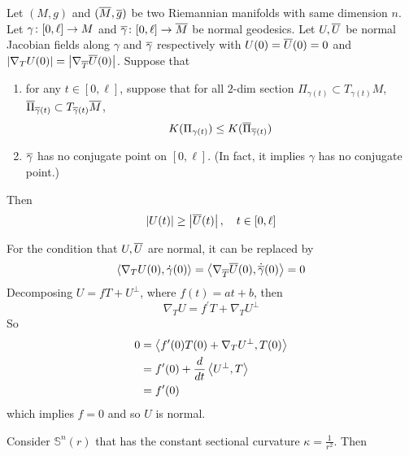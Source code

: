 \begin{enumerate}[label=\arabic{*}.]
	\begin{thm}\label{thm:rouch}
		Let $(M,g)$ and $(\overline{M},\overline{g})$ be two Riemannian manifolds with same dimension $n$. Let $\gamma \colon [0,\ell] \rightarrow M$ and $\overline{\gamma} \colon [0,\ell] \rightarrow \overline{M}$ be normal geodesics. Let $U,\overline{U}$ be normal Jacobian fields along $\gamma$ and $\overline{\gamma}$ respectively with $U(0) = \overline{U}(0)=0$ and $\left\lvert\nabla_TU(0)\right\lvert = \left\lvert\nabla_{\overline{T}}\overline{U}(0)\right\lvert$. Suppose that
		\begin{enumerate}[label=(\roman*)]
			\item for any $t \in [0,\ell]$, suppose that for all $2$-dim section $\Pi_{\gamma(t)} \subset T_{\gamma(t)}M$, $\overline{\Pi}_{\overline{\gamma}(t)} \subset T_{\overline{\gamma}(t)}\overline{M}$,
			\begin{equation*}
				K(\Pi_{\gamma(t)}) \leq K(\overline{\Pi}_{\overline{\gamma}(t)})
			\end{equation*}
			\item $\overline{\gamma}$ has no conjugate point on $[0,\ell]$. (In fact, it implies $\gamma$ has no conjugate point.)
		\end{enumerate}
		Then
		\begin{equation*}
			\left\lvert U(t)\right\lvert \geq \left\lvert\overline{U}(t)\right\lvert,\quad t \in [0,\ell]
		\end{equation*}
	\end{thm}
	\begin{rmk}
		For the condition that $U,\overline{U}$ are normal, it can be replaced by
		\begin{equation*}
			\left\langle \nabla_TU(0),\dot{\gamma}(0) \right\rangle = \left\langle \nabla_{\overline{T}}\overline{U}(0),\dot{\overline{\gamma}}(0) \right\rangle = 0
		\end{equation*}
		Decomposing $U = fT + U^\perp$, where $f(t) = at + b$, then
		\begin{equation*}
			\nabla_TU = f^\prime T + \nabla_TU^\perp
		\end{equation*}
		So
		\begin{equation*}
			\begin{aligned}
				0 & = \left\langle f^\prime(0) T(0) + \nabla_TU^\perp,T(0) \right\rangle \\
				&= f^\prime(0) + \frac{d}{dt}\left\langle U^\perp, T \right\rangle \\
				&= f^\prime(0)
			\end{aligned}
		\end{equation*}
		which implies $f = 0$ and so $U$ is normal.
	\end{rmk}
	\begin{exam}
		Consider $\mathbb{S}^n(r)$ that has the constant sectional curvature $\kappa = \frac{1}{r^2}$. Then

\end{exam}
\end{enumerate}
